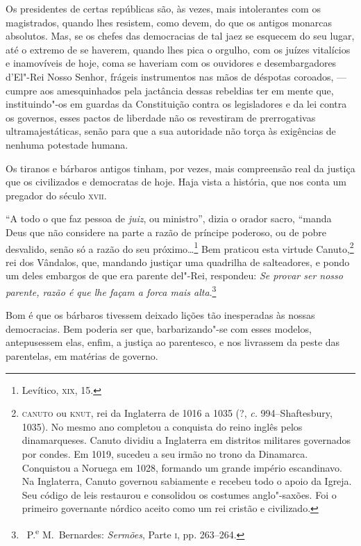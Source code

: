 Os presidentes de certas repúblicas são, às vezes, mais
intolerantes com os magistrados, quando lhes resistem, como devem, do
que os antigos monarcas absolutos. Mas, se os chefes das democracias de
tal jaez se esquecem do seu lugar, até o extremo de se haverem, quando
lhes pica o orgulho, com os juízes vitalícios e inamovíveis de hoje,
coma se haveriam com os ouvidores e desembargadores
d'El"-Rei Nosso Senhor, frágeis instrumentos nas mãos
de déspotas coroados, --- cumpre aos amesquinhados pela jactância dessas
rebeldias ter em mente que, instituindo"-os em guardas da Constituição
contra os legisladores e da lei contra os governos, esses pactos de
liberdade não os revestiram de prerrogativas ultramajestáticas, senão
para que a sua autoridade não torça às exigências de nenhuma potestade
humana.

Os tiranos e bárbaros antigos tinham, por vezes, mais compreensão
real da justiça que os civilizados e democratas de hoje. Haja vista a
história, que nos conta um pregador do século \textsc{xvii}.

``A todo o que faz pessoa de \textit{juiz}, ou
ministro'', dizia o orador sacro, ``manda
Deus que não considere na parte a razão de príncipe poderoso, ou de
pobre desvalido, senão só a razão do seu próximo\ldots{}\footnote{ Levítico,
\textsc{xix}, 15.} Bem praticou esta virtude Canuto,\footnote{ \textsc{canuto} ou
\textsc{knut}, rei da Inglaterra de 1016 a 1035 (?, \textit{c.} 994--Shaftesbury, 1035). 
No mesmo ano completou a conquista do reino inglês pelos dinamarqueses.
Canuto dividiu a Inglaterra em distritos militares governados por
condes. Em 1019, sucedeu a seu irmão no trono da Dinamarca. Conquistou
a Noruega em 1028, formando um grande império escandinavo. Na
Inglaterra, Canuto governou sabiamente e recebeu todo o apoio da
Igreja. Seu código de leis restaurou e consolidou os costumes
anglo"-saxões. Foi o primeiro governante nórdico aceito como um rei
cristão e civilizado.} rei dos Vândalos, que, mandando
justiçar uma quadrilha de salteadores, e pondo um deles embargos de que
era parente del"-Rei, respondeu: \textit{Se provar ser nosso parente,
razão é que lhe façam a forca mais alta}.\footnote{\ P.\textsuperscript{e} 
M.~Bernardes: \textit{Sermões}, Parte \textsc{i}, pp. 263--264.}

Bom é que os bárbaros tivessem deixado lições tão inesperadas às
nossas democracias. Bem poderia ser que, barbarizando"-se com esses
modelos, antepusessem elas, enfim, a justiça ao parentesco, e nos
livrassem da peste das parentelas, em matérias de governo.

